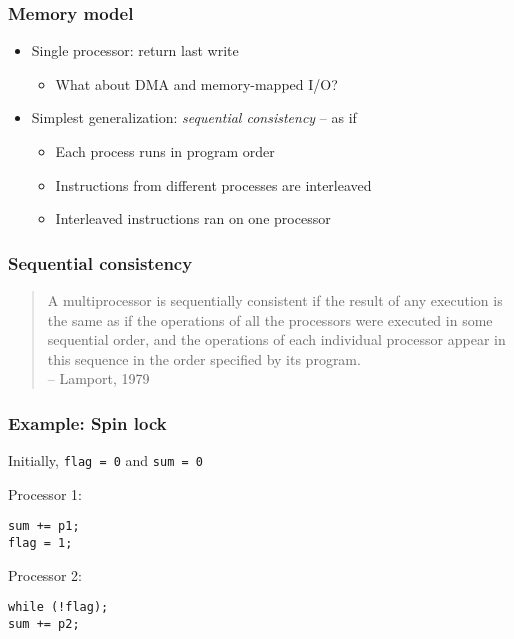 \documentclass{beamer}
\begin{document}
\begin{frame}
  \frametitle{Memory model}

  \begin{itemize}
  \item Single processor: return last write
    \begin{itemize}
    \item What about DMA and memory-mapped I/O?
    \end{itemize}
  \item Simplest generalization: {\em sequential consistency} -- as if
    \begin{itemize}
    \item Each process runs in program order
    \item Instructions from different processes are interleaved
    \item Interleaved instructions ran on one processor
    \end{itemize}
  \end{itemize}
\end{frame}


\begin{frame}
  \frametitle{Sequential consistency}

  \begin{quote}
    A multiprocessor is sequentially consistent if the result
    of any execution is the same as if the operations of all the
    processors were executed in some sequential order, and the
    operations of each individual processor appear in this sequence
    in the order specified by its program. \\
    \hfill -- Lamport, 1979
  \end{quote}

\end{frame}


\begin{frame}[fragile]
  \frametitle{Example: Spin lock}

Initially, {\tt flag = 0} and {\tt sum = 0}

\vspace{5mm}
\hspace{0.04\textwidth}
\begin{minipage}{0.45\textwidth}
Processor 1:
\begin{verbatim}
sum += p1;
flag = 1;
\end{verbatim}
\end{minipage}
\begin{minipage}{0.45\textwidth}
Processor 2:
\begin{verbatim}
while (!flag);
sum += p2;
\end{verbatim}
\end{minipage}

\end{frame}
\end{document}
